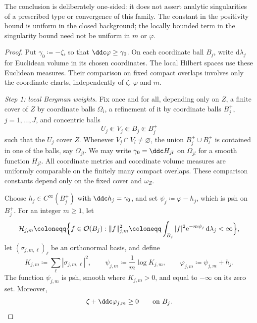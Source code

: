 The conclusion is deliberately one-sided: it does not assert analytic singularities of a prescribed type or convergence of this family. The constant in the positivity bound is uniform in the closed background; the locally bounded term in the singularity bound need not be uniform in $m$ or $\varphi$.
 
\begin{proof}
Put $\gamma_0\coloneqq -\zeta$, so that $\ddc\varphi\ge\gamma_0$.
On each coordinate ball $B_j$, write $\mathrm{d}\lambda_j$ for Euclidean
volume in its chosen coordinates. The local Hilbert spaces use these
Euclidean measures. Their comparison on fixed compact overlaps involves
only the coordinate charts, independently of $\zeta$, $\varphi$ and $m$.
 
\emph{Step 1: local Bergman weights.}
Fix once and for all, depending only on $Z$, a finite cover of $Z$ by
coordinate balls $\Omega_i$, a refinement of it by coordinate balls
$B_j^+$, $j=1,\dots,J$, and concentric balls
\[
  U_j\Subset V_j\Subset B_j\Subset B_j^+
\]
such that the $U_j$ cover $Z$. Whenever
$\overline V_j\cap\overline V_l\ne\varnothing$, the union
$B_j^+\cup B_l^+$
is contained in one of the balls, say $\Omega_{jl}$. We may write
$\gamma_0=\ddc H_{jl}$ on $\Omega_{jl}$ for a smooth function $H_{jl}$.
All coordinate metrics and coordinate volume measures are uniformly comparable on the finitely many compact overlaps. These comparison constants depend only on the fixed cover and $\omega_Z$.
 
Choose $h_j\in C^\infty(B_j^+)$ with $\ddc h_j=\gamma_0$, and set
$\psi_j\coloneqq \varphi-h_j$, which is psh on $B_j^+$. For an integer
$m\ge1$, let
\[
  \mathcal H_{j,m}\coloneqq \Bigl\{f\in\mathcal O(B_j):
     \|f\|_{j,m}^2\coloneqq \int_{B_j}|f|^2\mathrm{e}^{-m\psi_j}\,\mathrm{d}\lambda_j<\infty\Bigr\},
\]
let $(\sigma_{j,m,\ell})_\ell$ be an orthonormal basis, and define
\[
  K_{j,m}\coloneqq \sum_\ell|\sigma_{j,m,\ell}|^2,\qquad
  \psi_{j,m}\coloneqq \frac1m\log K_{j,m},\qquad
  \varphi_{j,m}\coloneqq \psi_{j,m}+h_j.
\]
The function $\psi_{j,m}$ is psh, smooth where $K_{j,m}>0$, and equal
to $-\infty$ on its zero set. Moreover,
\begin{equation}\label{nk:eq:reg-local-positivity}
  \zeta+\ddc\varphi_{j,m}\ge0\qquad\text{on }B_j.
\end{equation}
 

\end{proof}
